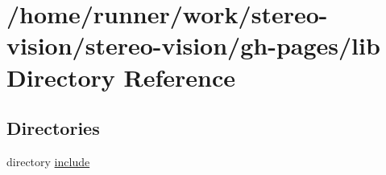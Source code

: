 \section{/home/runner/work/stereo-\/vision/stereo-\/vision/gh-\/pages/lib Directory Reference}
\label{dir_97aefd0d527b934f1d99a682da8fe6a9}
\subsection*{Directories}
\begin{DoxyCompactItemize}
\item 
directory \hyperlink{dir_5a30104352ef4255dc24354b02eb2d20}{include}
\end{DoxyCompactItemize}
